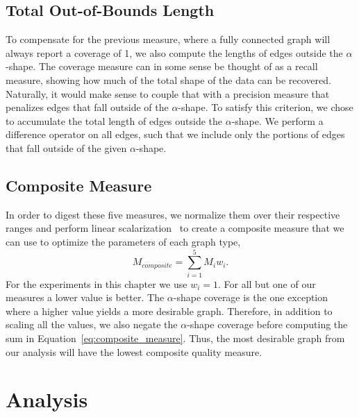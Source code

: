 \subsection{Total Out-of-Bounds Length}
%
To compensate for the previous measure, where a fully connected graph will always report a coverage of 1, we also compute the lengths of edges outside the $\alpha$-shape.
%
%
The coverage measure can in some sense be thought of as a recall measure, showing how much of the total shape of the data can be recovered.
%
Naturally, it would make sense to couple that with a precision measure that penalizes edges that fall outside of the $\alpha$-shape.
%
To satisfy this criterion, we chose to accumulate the total length of edges outside the $\alpha$-shape.
%
We perform a difference operator on all edges, such that we include only the portions of edges that fall outside of the given $\alpha$-shape.

\subsection{Composite Measure}
In order to digest these five measures, we normalize them over their respective ranges and perform linear scalarization~\cite{HwangMasud1979} to create a composite measure that we can use to optimize the parameters of each graph type,
%
\begin{equation}
    M_{composite} = \sum_{i=1}^5 M_iw_i.
\label{eq:composite_measure}
\end{equation}
%
For the experiments in this chapter we use $w_i=1$.
%
For all but one of our measures a lower value is better.
%
The $\alpha$-shape coverage is the one exception where a higher value yields a more desirable graph.
%
Therefore, in addition to scaling all the values, we also negate the $\alpha$-shape coverage before computing the sum in Equation~\ref{eq:composite_measure}.
%
Thus, the most desirable graph from our analysis will have the lowest composite quality measure.

\section{Analysis}

